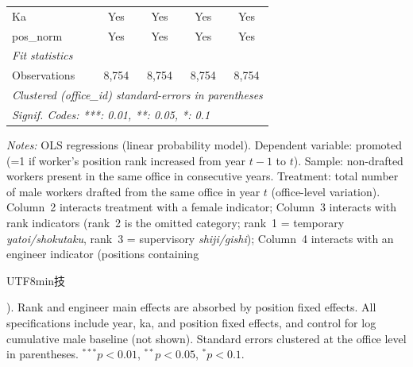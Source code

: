 \begin{table}[htbp]
\begin{threeparttable}
\begin{tabular}{lcccc}
   Ka                             & Yes           & Yes              & Yes            & Yes\\  
   pos\_norm                      & Yes           & Yes              & Yes            & Yes\\  
   \midrule
   \emph{Fit statistics}\\
   Observations                   & 8,754         & 8,754            & 8,754          & 8,754\\  
   \midrule \midrule
   \multicolumn{5}{l}{\emph{Clustered (office\_id) standard-errors in parentheses}}\\
   \multicolumn{5}{l}{\emph{Signif. Codes: ***: 0.01, **: 0.05, *: 0.1}}\\
\end{tabular}
\begin{tablenotes}[flushleft]
\footnotesize
\item \textit{Notes:} OLS regressions (linear probability model). Dependent variable: promoted (=1 if worker's position rank increased from year $t{-}1$ to $t$). Sample: non-drafted workers present in the same office in consecutive years. Treatment: total number of male workers drafted from the same office in year $t$ (office-level variation). Column~2 interacts treatment with a female indicator; Column~3 interacts with rank indicators (rank~2 is the omitted category; rank~1 = temporary \emph{yatoi/shokutaku}, rank~3 = supervisory \emph{shiji/gishi}); Column~4 interacts with an engineer indicator (positions containing \begin{CJK}{UTF8}{min}技\end{CJK}). Rank and engineer main effects are absorbed by position fixed effects. All specifications include year, ka, and position fixed effects, and control for log cumulative male baseline (not shown). Standard errors clustered at the office level in parentheses. $^{***}p<0.01$, $^{**}p<0.05$, $^{*}p<0.1$.
\end{tablenotes}
\end{threeparttable}
\end{table}
